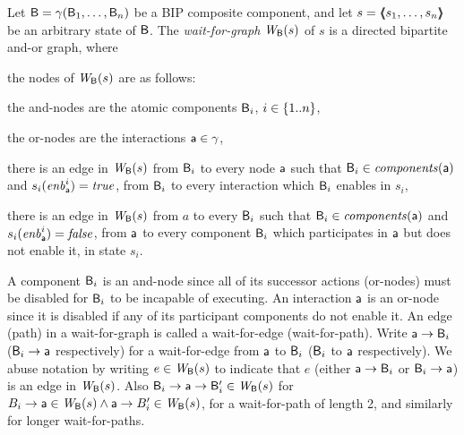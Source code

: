 \label{def:static:wait-for-graph}
Let $\mathsf{B} = \gamma(\mathsf{B}_1,\dots,\mathsf{B}_n)$ be a BIP composite component, and let
$s = \langle \hspace{-0.34em} \langle \hspace{-0.34em} \langle s_1,\ldots,s_n \rangle \hspace{-0.34em} \rangle \hspace{-0.34em} \rangle$ be an arbitrary state of $\mathsf{B}$.
The {\em wait-for-graph} $\mathit{W}_{\mathsf{B}}({s})$ of $s$ is a directed bipartite and-or graph, where
\begin{nlst1}

\item \label{def:static:wait-for-graph:nodes} the nodes of $\mathit{W}_{\mathsf{B}}({s})$ are as follows:
%
   \begin{nlst2}
   \item the and-nodes are the atomic components $\mathsf{B}_i$, $i \in \{ 1..n \}$,
   \item the or-nodes are the interactions $\mathsf{a} \in \gamma$,
   \end{nlst2}

\item \label{def:static:wait-for-graph:edges-aut-action} 
   there is an edge in $\mathit{W}_{\mathsf{B}}({s})$ from $\mathsf{B}_i$ to every node 
   $\mathsf{a}$ such that $\mathsf{B}_i \in \mathit{components}(\mathsf{a})$ and $s_i(\mathit{enb}_{\mathsf{a}}^{i}) = \mathit{true}$, \ie from $\mathsf{B}_i$ to every interaction
   which $\mathsf{B}_i$ enables in $s_i$,

\item  \label{def:static:wait-for-graph:edges-action-aut}
   there is an edge in $\mathit{W}_{\mathsf{B}}({s})$ from $a$ to every 
   $\mathsf{B}_i$ such that $\mathsf{B}_i \in \mathit{components}(\mathsf{a})$ and $s_i(\mathit{enb}_{\mathsf{a}}^{i}) = \mathit{false}$, \ie from $\mathsf{a}$ to every component
   $\mathsf{B}_i$ which participates in $\mathsf{a}$ but does not enable it, in state $s_i$.
                  
\end{nlst1}
\ed

A component $\mathsf{B}_i$ is an and-node since all of its successor actions (or-nodes) must be disabled for $\mathsf{B}_i$ to be
incapable of executing.  An interaction $\mathsf{a}$ is an or-node since it is disabled if any of its participant components do
not enable it.  An edge (path) in a wait-for-graph is called a wait-for-edge (wait-for-path).  Write $\mathsf{a} \rightarrow \mathsf{B}_i$
($\mathsf{B}_i \rightarrow \mathsf{a}$ respectively) for a wait-for-edge from $\mathsf{a}$ to $\mathsf{B}_i$ ($\mathsf{B}_i$ to $\mathsf{a}$ respectively).  We abuse notation by
writing $e \in \mathit{W}_{\mathsf{B}}({s})$ to indicate that $e$ (either $\mathsf{a} \rightarrow \mathsf{B}_i$ or $\mathsf{B}_i
\rightarrow \mathsf{a}$) is an edge in $\mathit{W}_{\mathsf{B}}({s})$.  Also $\mathsf{B}_i \rightarrow \mathsf{a} \rightarrow \mathsf{B}'_i \in \mathit{W}_{\mathsf{B}}({s})$ for $B_i \rightarrow \mathsf{a} \in \mathit{W}_{\mathsf{B}}({s}) \land \mathsf{a} \rightarrow B'_i \in
\mathit{W}_{\mathsf{B}}({s})$, \ie for a wait-for-path of length 2, and similarly for longer wait-for-paths.

